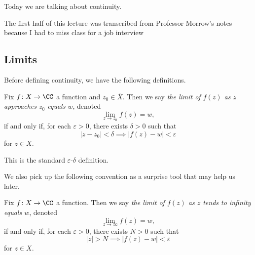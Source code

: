 \documentclass[../notes.tex]{subfiles}
\begin{document}

Today we are talking about continuity.
\begin{warn}
	The first half of this lecture was transcribed from Professor Morrow's notes because I had to miss class for a job interview
\end{warn}

\subsection{Limits}
Before defining continuity, we have the following definitions.
\begin{definition}[Limit]
	Fix $f\colon X\to\CC$ a function and $z_0\in\overline X$. Then we say \textit{the limit of $f(z)$ as $z$ approaches $z_0$ equals $w$}, denoted
	\[\lim_{z\to z_0}f(z)=w,\]
	if and only if, for each $\varepsilon>0$, there exists $\delta>0$ such that
	\[|z-z_0|<\delta\implies|f(z)-w|<\varepsilon\]
	for $z\in X$.
\end{definition}
This is the standard $\varepsilon$-$\delta$ definition.

We also pick up the following convention as a surprise tool that may help us later.
\begin{definition}
	Fix $f\colon X\to\CC$ a function. Then we say \textit{the limit of $f(z)$ as $z$ tends to infinity equals $w$}, denoted
	\[\lim_{z\to\infty}f(z)=w,\]
	if and only if, for each $\varepsilon>0$, there exists $N>0$ such that
	\[|z|>N\implies|f(z)-w|<\varepsilon\]
	for $z\in X$.
\end{definition}
\end{document}
